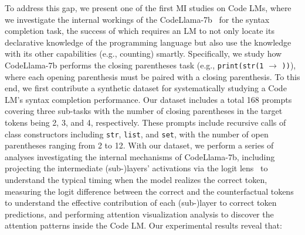 To address this gap, we present one of the first MI studies on Code LMs, where we investigate the internal workings of the CodeLlama-7b~\cite{roziere2023code} for the syntax completion task, the success of which requires an LM to not only locate its declarative knowledge of the programming language but also use the knowledge with its other capabilities (e.g., counting) smartly.
Specifically, we study how CodeLlama-7b performs the closing parentheses task (e.g., \lstinline|print(str(1| $\rightarrow$ \lstinline|))|), where each opening parenthesis must be paired with a closing parenthesis. To this end, we first contribute a synthetic dataset for systematically studying a Code LM's syntax completion performance. Our dataset includes a total 168 prompts covering three sub-tasks with the number of closing parentheses in the target tokens being 2, 3, and 4, respectively. These prompts include recursive calls of class constructors including \lstinline|str|, \lstinline|list|, and \lstinline|set|, with the number of open parentheses ranging from 2 to 12. With our dataset,
we perform a series of analyses investigating the internal mechanisms of CodeLlama-7b, including projecting the intermediate (sub-)layers' activations via the logit lens~\cite{nostalgebraist2020blog} to understand the typical timing when the model realizes the correct token, measuring the logit difference between the correct and the counterfactual tokens to understand the effective contribution of each (sub-)layer to correct token predictions, and performing attention visualization analysis to discover the attention patterns inside the Code LM. 
Our experimental results reveal that: 
